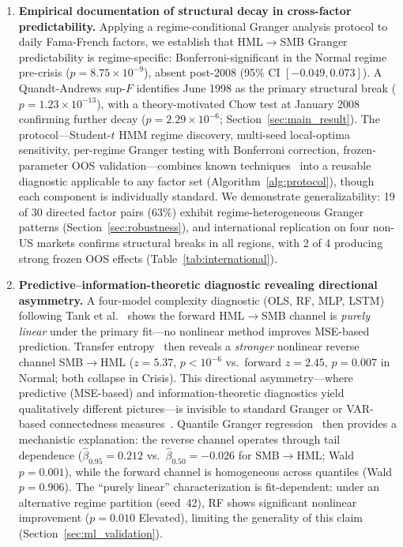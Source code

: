 \documentclass[sigconf,anonymous]{acmart}
\begin{document}
\begin{enumerate}
    \item \textbf{Empirical documentation of structural decay in cross-factor predictability.}
    Applying a regime-conditional Granger analysis protocol to daily
    Fama-French factors, we establish that HML$\to$SMB
    Granger predictability is regime-specific: Bonferroni-significant
    in the Normal regime pre-crisis ($p = 8.75 \times 10^{-9}$),
    absent post-2008 (95\% CI $[-0.049, 0.073]$).
    A Quandt-Andrews sup-$F$ identifies June 1998 as the primary structural break
    ($p = 1.23 \times 10^{-13}$), with a theory-motivated Chow test
    at January 2008 confirming further decay
    ($p = 2.29 \times 10^{-6}$; Section~\ref{sec:main_result}).
    The protocol---Student-$t$ HMM regime discovery,
    multi-seed local-optima sensitivity, per-regime Granger testing with
    Bonferroni correction, frozen-parameter OOS validation---combines
    known techniques~\cite{psaradakis2005markov,bulla2011hidden,tank2022neural}
    into a reusable diagnostic applicable to any factor set
    (Algorithm~\ref{alg:protocol}),
    though each component is individually standard.
    We demonstrate generalizability: 19 of 30 directed factor pairs
    (63\%) exhibit regime-heterogeneous Granger patterns
    (Section~\ref{sec:robustness}), and international replication
    on four non-US markets confirms structural breaks in all regions,
    with 2 of 4 producing strong frozen OOS effects
    (Table~\ref{tab:international}).

    \item \textbf{Predictive--information-theoretic diagnostic revealing directional asymmetry.}
    A four-model complexity diagnostic (OLS, RF, MLP, LSTM) following
    Tank et al.~\cite{tank2022neural} shows the forward HML$\to$SMB
    channel is \emph{purely linear} under the primary fit---no
    nonlinear method improves MSE-based prediction.
    Transfer entropy~\cite{schreiber2000measuring} then reveals a
    \emph{stronger} nonlinear reverse channel SMB$\to$HML
    ($z = 5.37$, $p < 10^{-6}$ vs.\ forward $z = 2.45$, $p = 0.007$
    in Normal; both collapse in Crisis).
    This directional asymmetry---where predictive (MSE-based)
    and information-theoretic diagnostics yield qualitatively
    different pictures---is invisible to standard Granger or
    VAR-based connectedness measures~\cite{diebold2012better}.
    Quantile Granger regression~\cite{troster2019testing} then
    provides a mechanistic explanation: the reverse channel
    operates through tail dependence ($\hat{\beta}_{0.95} = 0.212$
    vs.\ $\hat{\beta}_{0.50} = -0.026$ for SMB$\to$HML;
    Wald $p = 0.001$), while the forward channel is
    homogeneous across quantiles (Wald $p = 0.906$).
    The ``purely linear'' characterization is fit-dependent:
    under an alternative regime partition (seed~42), RF shows
    significant nonlinear improvement ($p = 0.010$ Elevated),
    limiting the generality of this claim
    (Section~\ref{sec:ml_validation}).


\end{enumerate}
\end{document}

